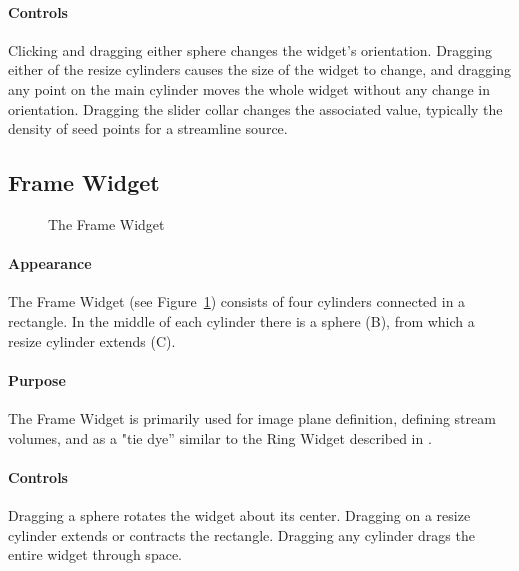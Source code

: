 \paragraph{Controls} Clicking and dragging either sphere changes the widget's orientation.  Dragging either of the resize
cylinders causes the size of the widget to change, and dragging any point on
the main cylinder moves the whole widget without any change in orientation.
Dragging the slider collar changes the associated value, typically the
density of seed points for a streamline source.

\subsection{Frame Widget}
\label{sec:view-framewidget} 

\begin{figure}[htb]
  \begin{makeimage}
  \end{makeimage}
  \framewidget
  \caption{\label{fig:framewidget} The Frame Widget}
\end{figure}


\paragraph{Appearance} The
Frame Widget (see Figure~\ref{fig:framewidget}) consists of four cylinders connected in a rectangle.  In
the middle of each cylinder there is a sphere (B), from which
a resize cylinder extends (C).

\paragraph{Purpose} The Frame Widget is primarily used for image
plane definition, defining stream volumes, and as a "tie dye'' similar to
the Ring Widget described in .

\paragraph{Controls} Dragging a sphere rotates the widget about its center. Dragging on a resize cylinder extends or contracts the rectangle.
Dragging any cylinder drags the entire widget through space.


